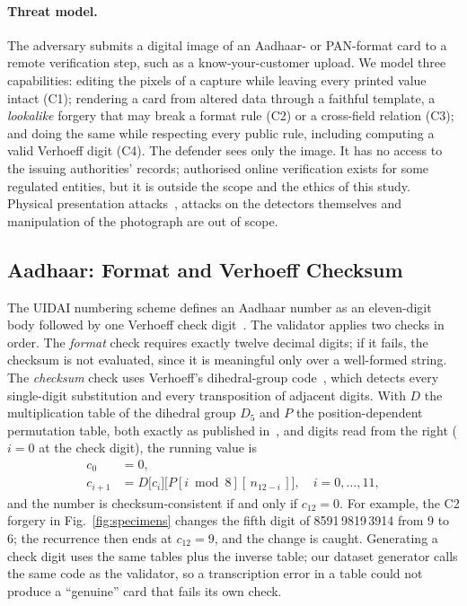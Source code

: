 \documentclass[conference]{IEEEtran}
\begin{document}
\paragraph*{Threat model.} The adversary submits a digital image of an
Aadhaar- or PAN-format card to a remote verification step, such as a
know-your-customer upload. We model three capabilities: editing the
pixels of a capture while leaving every printed value intact (C1);
rendering a card from altered data through a faithful template, a
\emph{lookalike} forgery that may break a format rule (C2) or a
cross-field relation (C3); and doing the same while respecting every
public rule, including computing a valid Verhoeff digit (C4). The
defender sees only the image. It has no access to the issuing
authorities' records; authorised online verification exists for some
regulated entities, but it is outside the scope and the ethics of this
study. Physical presentation attacks~\cite{pad}, attacks on the
detectors themselves and manipulation of the photograph are out of
scope.

\subsection{Aadhaar: Format and Verhoeff Checksum}
\label{sec:aadhaar-validation}

The UIDAI numbering scheme defines an Aadhaar number as an eleven-digit
body followed by one Verhoeff check digit~\cite{uidai-scheme}. The
validator applies two checks in order. The \emph{format} check requires
exactly twelve decimal digits; if it fails, the checksum is not
evaluated, since it is meaningful only over a well-formed string. The
\emph{checksum} check uses Verhoeff's dihedral-group code~\cite{verhoeff},
which detects every single-digit substitution and every transposition
of adjacent digits. With $D$ the multiplication table of the dihedral
group $D_5$ and $P$ the position-dependent permutation table, both
exactly as published in~\cite{verhoeff}, and digits read from the right
($i=0$ at the check digit), the running value is
\begin{equation}
\label{eq:verhoeff}
\begin{aligned}
c_0 &= 0,\\
c_{i+1} &= D\big[c_i\big]\big[P[i \bmod 8][\,n_{12-i}\,]\big],\quad i = 0,\dots,11,
\end{aligned}
\end{equation}
and the number is checksum-consistent if and only if $c_{12}=0$. For
example, the C2 forgery in Fig.~\ref{fig:specimens} changes the fifth
digit of 8591\,9819\,3914 from 9 to 6; the recurrence then ends at
$c_{12}=9$, and the change is caught. Generating a check digit uses the same tables plus the inverse table;
our dataset generator calls the same code as the validator, so a
transcription error in a table could not produce a ``genuine'' card that
fails its own check.
\end{document}
